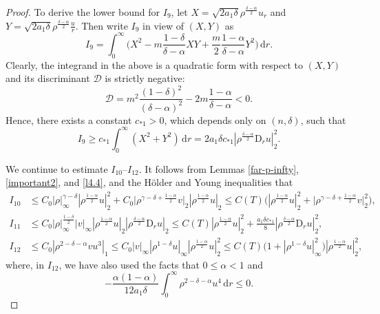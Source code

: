 \documentclass[11pt,reqno]{amsart}
\numberwithin{rk}{section}
\numberwithin{prop}{section}
\numberwithin{mydef}{section}
\numberwithin{lem}{section}
\numberwithin{equation}{section}
\numberwithin{thm}{section}
\begin{document}
\begin{proof}
To derive the lower bound for $I_{9}$, let $X=\sqrt{2a_1\delta} \rho^\frac{\delta-\alpha}{2}u_r$ and  $Y=\sqrt{2a_1\delta} \rho^\frac{\delta-\alpha}{2} \frac{u}{r}$. Then write $I_{9}$ in view of $(X,Y)$ as
\begin{equation*}
I_{9}=\int_0^\infty \Big(X^2-m\frac{1-\delta}{\delta-\alpha}XY+\frac{m}{2}\frac{1-\alpha}{\delta-\alpha}Y^2\Big)\,\mathrm{d}r.    
\end{equation*}
Clearly, the integrand in the above is a quadratic form with respect to $(X,Y)$ and its discriminant $\mathscr{D}$ is strictly negative:
\begin{equation*}
\mathscr{D}=m^2\frac{(1-\delta)^2}{(\delta-\alpha)^2}-2m\frac{1-\alpha}{\delta-\alpha}<0.
\end{equation*}
Hence, there exists a constant $c_{*1}>0$, which depends only on $(n,\delta)$, such that
\begin{equation}
I_{9}\geq c_{*1}\int_0^\infty (X^2+Y^2)\,\mathrm{d}r=2a_1\delta c_{*1} |\rho^\frac{\delta-\alpha}{2}\mathrm{D}_r u|_2^2.  
\end{equation}

We continue to estimate $I_{10}$--$I_{12}$. It follows from Lemmas \ref{far-p-infty}, \ref{important2}, and \ref{l4.4}, and the H\"older and Young inequalities that
\begin{equation}\label{6.8'}
\begin{aligned}
I_{10}&\leq C_0|\rho|_\infty^{\gamma-\delta}|\rho^\frac{1-\alpha}{2}u|_2^2+C_0\big|\rho^{\gamma-\delta+\frac{1-\alpha}{2}} v\big|_2|\rho^\frac{1-\alpha}{2}u|_{2}\leq C(T)\big(|\rho^\frac{1-\alpha}{2}u|_2^2+\big|\rho^{\gamma-\delta+\frac{1-\alpha}{2}} v\big|_2^2\big),\\
I_{11}&\leq C_0|\rho|_\infty^\frac{1-\delta}{2}|v|_\infty|\rho^\frac{1-\alpha}{2}u|_2  |\rho^\frac{\delta-\alpha}{2}\mathrm{D}_r u|_2\leq C(T)|\rho^\frac{1-\alpha}{2}u|_2^2+\frac{a_1\delta c_{*1}}{8} |\rho^\frac{\delta-\alpha}{2}\mathrm{D}_r u|_2^2,\\
I_{12}&\leq C_0|\rho^{2-\delta-\alpha}vu^3|_1\leq C_0|v|_\infty|\rho^{1-\delta}u|_\infty |\rho^\frac{1-\alpha}{2}u|_2^2\leq C(T)\big(1+|\rho^{1-\delta}u|_\infty^2\big) |\rho^\frac{1-\alpha}{2}u|_2^2,
\end{aligned}
\end{equation}
where, in $I_{12}$, we have also used the facts that $0\leq \alpha<1$ and 
\begin{equation*}
-\frac{\alpha(1-\alpha)}{12a_1\delta}\int_0^\infty \rho^{2-\delta-\alpha}u^4\,\mathrm{d}r\leq 0.
\end{equation*}


\end{proof}
\end{document}
